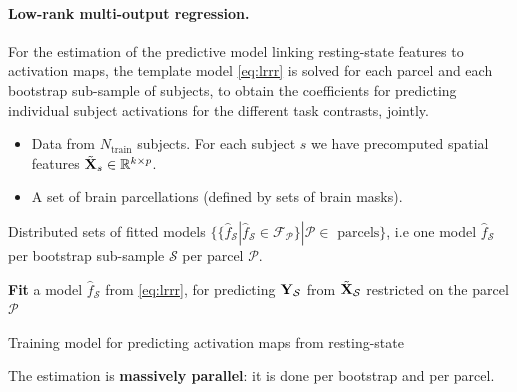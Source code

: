 \paragraph{Low-rank multi-output regression.}
For the estimation of the predictive model
linking resting-state features to activation maps, the template model
\eqref{eq:lrrr} is solved for each parcel and each bootstrap sub-sample of
subjects, to obtain the coefficients for predicting individual subject
activations for the different task contrasts, jointly.
%
\begin{algorithm}
  \begin{algorithmic}[1]
    \Require
    \begin{itemize}
    \item Data from $N_{\text{train}}$ subjects. For each subject $s$ we have
      precomputed spatial features $\tilde{\mathbf{X}}_s \in \mathbb R^{k \times p}$.
      
      
      \item A set of brain parcellations (defined by sets of brain masks).
      \end{itemize}
    \Ensure Distributed sets of fitted models $\{\{\hat{f}_{\mathcal S}|\hat{f}_{\mathcal S} \in
    \mathcal F_{\mathcal P}\} | \mathcal P \in \text{ parcels}\}$,
    i.e one model $\hat{f}_{\mathcal S}$ per bootstrap sub-sample  $\mathcal S$ per parcel
    $\mathcal P$.
  
  \State  \textbf{Fit} a model $\hat{f}_{\mathcal S}$ from \eqref{eq:lrrr}, for predicting $\mathbf{Y}_{\mathcal S}$ from
  $\tilde{\mathbf{X}}_{\mathcal S}$ restricted on the parcel $\mathcal P$
\EndParFor

\EndParFor
\end{algorithmic}
\caption{Training model for predicting activation maps from resting-state}
\label{Tab:algfit}
\end{algorithm}
The estimation is \textbf{massively parallel}:
it is done per bootstrap and per parcel.


